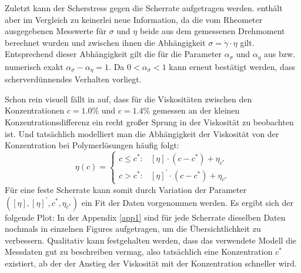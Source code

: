 \documentclass[11pt,a4paper,oneside]{scrartcl}
\begin{document}
Zuletzt kann der Scherstress gegen die Scherrate aufgetragen werden.  enthält aber im Vergleich zu  keinerlei neue Information, da die vom Rheometer ausgegebenen Messwerte für $\sigma$ und $\eta$ beide aus dem gemessenen Drehmoment berechnet wurden und zwischen ihnen die Abhängigkeit $\sigma=\dot\gamma\cdot\eta$ gilt.
Entsprechend dieser Abhängigkeit gilt die für die Parameter $\alpha_\sigma$ und $\alpha_\eta$ aus  bzw.  numerisch exakt $\alpha_\sigma-\alpha_\eta=1$. Da $0<\alpha_\sigma<1$ kann erneut bestätigt werden, dass scherverdünnendes Verhalten vorliegt. \par
Schon rein visuell fällt in  auf, dass für die Viskositäten zwischen den Konzentrationen $c=1.0\%$ und $c=1.4\%$ gemessen an der kleinen Konzentrationsdifferenz ein recht großer Sprung in der Viskosität zu beobachten ist. Und tatsächlich modelliert man die Abhängigkeit der Viskosität von der Konzentration bei Polymerlösungen häufig folgt:
\begin{equation}
\eta(c)=\begin{cases} c\leq c^*: & [\eta]\cdot(c-c^*)+\eta_{c^*}\\
c>c^*: & [\eta]^\prime\cdot(c-c^*)+\eta_{c^*}
\end{cases}
\end{equation}
Für eine feste Scherrate kann somit durch Variation der Parameter $([\eta],[\eta]^\prime,c^*,\eta_{c^*})$ ein Fit der Daten vorgenommen werden. Es ergibt sich der folgende Plot:
In der Appendix \ref{app1} sind für jede Scherrate dieselben Daten nochmals in einzelnen Figures aufgetragen, um die Übersichtlichkeit zu verbessern. Qualitativ kann festgehalten werden, dass das verwendete Modell die Messdaten gut zu beschreiben vermag, also tatsächlich eine Konzentration $c^*$ existiert, ab der der Anstieg der Viskosität mit der Konzentration schneller wird. \\
\end{document}
